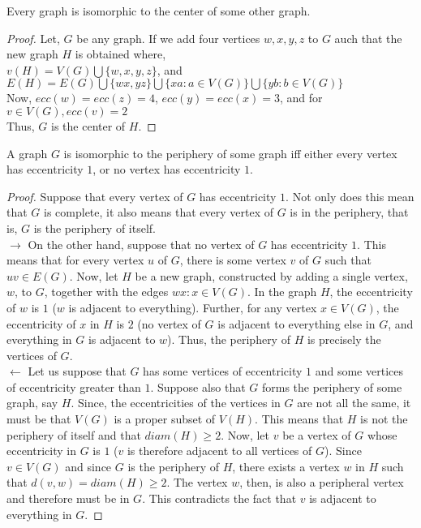 \begin{thm}
    Every graph is isomorphic to the center of some other graph.
\end{thm}
\begin{proof}
    Let, $G$ be any graph. If we add four vertices $w,x,y,z$ to $G$ auch that the new graph $H$ is obtained where,\\
    $v(H)=V(G) \bigcup \{w,x,y,z\}$, and\\
    $E(H)=E(G) \bigcup \{wx,yz\} \bigcup \{xa:a \in V(G)\} \bigcup \{yb:b \in V(G)\}$\\
    Now, $ecc(w)=ecc(z)=4$, $ecc(y)=ecc(x)=3$, and for $v \in V(G), ecc(v)=2$\\
    Thus, $G$ is the center of $H$.
\end{proof}

\begin{thm}
    A graph $G$ is isomorphic to the periphery of some graph iff either every vertex has eccentricity $1$, or no vertex has eccentricity $1$. 
\end{thm}
\begin{proof}
Suppose that every vertex of $G$ has eccentricity $1$. Not only does this mean that $G$ is complete, it also means that every vertex of $G$ is in the periphery, that is, $G$ is the periphery of itself.\\
$\rightarrow$ On the other hand, suppose that no vertex of $G$ has eccentricity $1$. This means that for every vertex $u$ of $G$, there is some vertex $v$ of $G$ such that $uv \in E(G)$. Now, let $H$ be a new graph, constructed by adding a single vertex, $w$, to $G$, together with the edges ${wx:x \in V (G)}$. In the graph $H$, the eccentricity of $w$ is $1$ ($w$ is adjacent to everything). Further, for any vertex $x \in V (G)$, the eccentricity of $x$ in $H$ is $2$ (no vertex of $G$ is adjacent to everything else in $G$, and everything in $G$ is adjacent to $w$). Thus, the periphery of $H$ is precisely the vertices of $G$.\\
$\leftarrow$ Let us suppose that $G$ has some vertices of eccentricity $1$ and some vertices of eccentricity greater than $1$. Suppose also that $G$ forms the periphery of some graph, say $H$. Since, the eccentricities of the vertices in $G$ are not all the same, it must be that $V(G)$ is a proper subset of $V(H)$. This means that $H$ is not the periphery of itself and that $diam(H) \ge 2$. Now, let $v$ be a vertex of $G$ whose eccentricity in $G$ is $1$ ($v$ is therefore adjacent to all vertices of $G$). Since $v \in V(G)$ and since $G$ is the periphery of $H$, there exists a vertex $w$ in $H$ such that $d(v,w) = diam(H) \ge 2$. The vertex $w$, then, is also a peripheral vertex and therefore must be in $G$. This contradicts the fact that $v$ is adjacent to everything in $G$.
\end{proof}